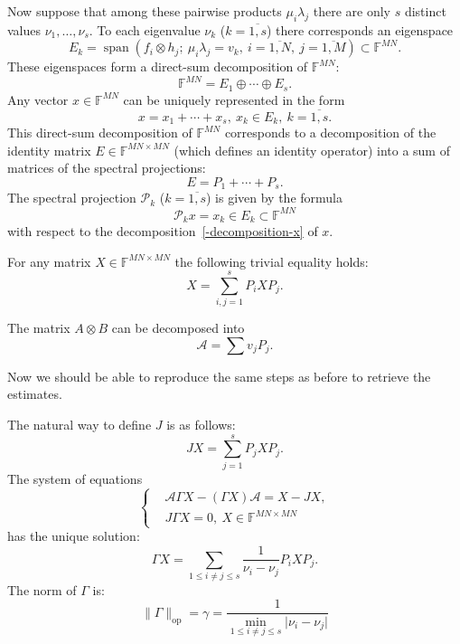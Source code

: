 \documentclass[14pt,a4paper]{extarticle}
\theoremstyle{definition}
\begin{document}
Now suppose that among these pairwise products \( \mu_i \lambda_j \)
    there are only \( s \) distinct values \( \nu_1, \ldots, \nu_s \).
To each eigenvalue \( \nu_k \) (\( k{=}\overline{1,s} \)) there corresponds
    an eigenspace \[ E_k = \operatorname{span}(f_i\otimes h_j;\ \mu_i\lambda_j = v_k,\ i{=}\overline{1,N},\ j{=}\overline{1,M}) \subset \mathbb{F}^{MN}. \]
These eigenspaces form a direct-sum decomposition of \( \mathbb{F}^{MN} \):
    \[ \mathbb{F}^{MN} = E_1 \oplus \cdots \oplus E_s. \]
Any vector \( x\in\mathbb{F}^{MN} \) can be uniquely represented
    in the form
    \begin{equation}\label{-decomposition-x}
        x = x_1 + \cdots + x_s,\ x_k\in E_k,\ k=\overline{1,s}.
    \end{equation}
This direct-sum decomposition of \( \mathbb{F}^{MN} \)
    corresponds to a decomposition of the identity matrix \( E\in \mathbb{F}^{MN{\times}MN} \)
    (which defines an identity operator)
    into a sum of matrices of the spectral projections:
    \[
        E = P_1 + \cdots + P_s.
    \]
The spectral projection \( \mathcal{P}_k \) (\(k{=}\overline{1,s}\)) is given by the formula
    \[
        \mathcal{P}_k x = x_k \in E_k\subset \mathbb{F}^{MN}
    \]
    with respect to the decomposition~\eqref{-decomposition-x} of \( x \).

For any matrix \( X\in \mathbb{F}^{MN{\times}MN} \)
    the following trivial equality holds:
    \[
        X = \sum_{i,j=1}^s P_i X P_j.
    \]

The matrix \( A\otimes B \) can be decomposed into
    \[
        \mathcal{A} = \sum v_j P_j.
    \]

Now we should be able to reproduce the same steps as before
    to retrieve the estimates.

The natural way to define \( J \) is as follows:
    \[
        JX = \sum_{j=1}^s P_j X P_j.
    \]
The system of equations
    \[\left\{\begin{aligned}
        & \mathcal{A}\Gamma X - (\Gamma X) \mathcal{A} = X - JX, \\
        & J\Gamma X = 0,\ X\in \mathbb{F}^{MN{\times}MN}
    \end{aligned}\right.\]
    has the unique solution:
    \[
        \Gamma X = \sum_{1\leq i{\neq}j \leq s} \frac{1}{\nu_i-\nu_j} P_i X P_j.
    \]
    The norm of \( \Gamma \) is:
    \[
        \|\Gamma\|_{\mathrm{op}} = \gamma = \frac{1}{\min_{1\leq i{\neq}j\leq s}\lvert\nu_i - \nu_j\rvert}
    \]
\end{document}

